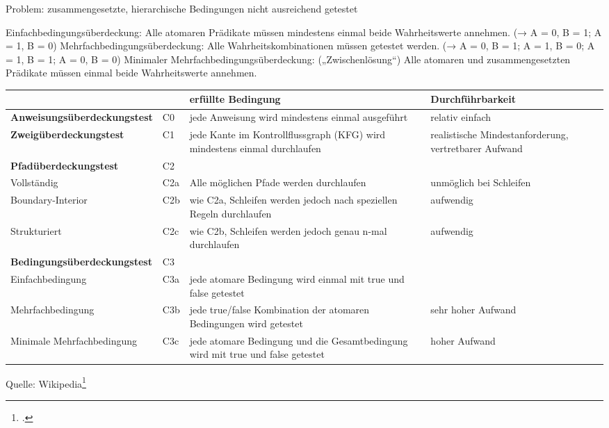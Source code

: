 \documentclass{lehramt-informatik-haupt}
\begin{document}
Problem: zusammengesetzte, hierarchische Bedingungen nicht ausreichend
getestet

Einfachbedingungsüberdeckung:
Alle atomaren Prädikate müssen mindestens einmal beide Wahrheitswerte
annehmen.
(→ A = 0, B = 1; A = 1, B = 0)
Mehrfachbedingungsüberdeckung:
Alle Wahrheitskombinationen müssen getestet werden.
(→ A = 0, B = 1; A = 1, B = 0; A = 1, B = 1; A = 0, B = 0)
Minimaler Mehrfachbedingungsüberdeckung: („Zwischenlösung“)
Alle atomaren und zusammengesetzten Prädikate müssen einmal beide
Wahrheitswerte annehmen.

{
\footnotesize
\noindent
\begin{tabular}{llL{4cm}L{3cm}}
&
&
\textbf{erfüllte Bedingung} &
\textbf{Durchführbarkeit}
\\

\hline

%

\textbf{Anweisungsüberdeckungstest}
&
C0 &
jede Anweisung wird mindestens einmal ausgeführt &
relativ einfach \\

\hline

%

\textbf{Zweigüberdeckungstest} &
C1 &
jede Kante im Kontrollflussgraph (KFG) wird mindestens einmal durchlaufen &
realistische Mindestanforderung, vertretbarer Aufwand \\

\hline

%

\textbf{Pfadüberdeckungstest} &
C2 &
&
\\

Vollständig &
C2a &
Alle möglichen Pfade werden durchlaufen &
unmöglich bei Schleifen \\

Boundary-Interior &
C2b &
wie C2a, Schleifen werden jedoch nach speziellen Regeln durchlaufen &
aufwendig \\

Strukturiert &
C2c &
wie C2b, Schleifen werden jedoch genau n-mal durchlaufen &
aufwendig \\

\hline

%

\textbf{Bedingungsüberdeckungstest} &
C3 &
&
\\

Einfachbedingung &
C3a &
jede atomare Bedingung wird einmal mit true und false getestet &
\\

Mehrfachbedingung &
C3b &
jede true/false Kombination der atomaren Bedingungen wird getestet &
sehr hoher Aufwand \\

Minimale Mehrfachbedingung &
C3c &
jede atomare Bedingung und die Gesamtbedingung wird mit true und false getestet &
hoher Aufwand\\
\end{tabular}

Quelle: Wikipedia\footcite{wiki:kontrollfluss-test}
}
\end{document}
